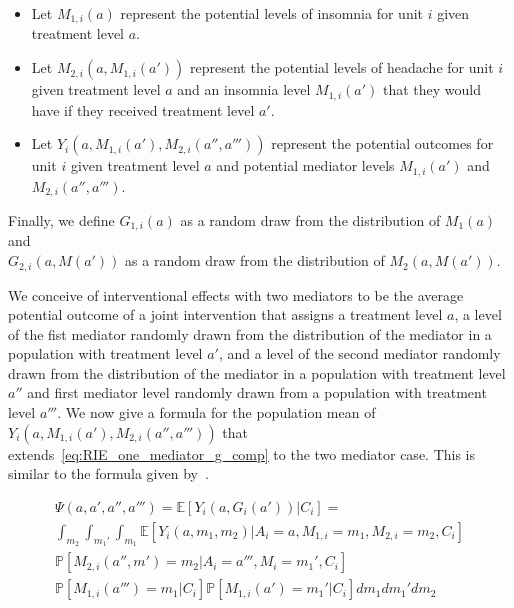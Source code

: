 \begin{itemize}[noitemsep,topsep=0pt]
	\item Let $M_{1,i}(a)$ represent the potential levels of insomnia for unit $i$ given 
	treatment level $a$. 
	\item Let $M_{2,i}(a,M_{1,i}(a'))$ represent the potential levels of headache for unit $i$ given 
	treatment level $a$ and an insomnia level $M_{1,i}(a')$ that they would have if they received 
	treatment level $a'$. 
	\item Let $Y_{i}(a,M_{1,i}(a'),M_{2,i}(a'',a'''))$ represent the potential outcomes 
	for unit $i$ given treatment level $a$ and potential mediator levels $M_{1,i}(a')$ and 
	$M_{2,i}(a'',a''')$. 
\end{itemize}

Finally, we define $G_{1,i}(a)$ as a random draw from the distribution of $M_{1}(a)$ 
and\\ $G_{2,i}(a,M(a'))$ as a random draw from the distribution of $M_{2}(a,M(a'))$. 

We conceive of interventional 
effects with two mediators to be the average potential outcome of a joint intervention that assigns
a treatment level $a$, a level of the fist mediator randomly drawn from the distribution of the 
mediator in a population with treatment level $a'$, and a level of the second mediator randomly drawn
from the distribution of the mediator in a population with treatment level $a''$ and first mediator 
level randomly drawn from a population with treatment level $a'''$. 
We now give a formula for the population mean of $Y_{i}(a,M_{1,i}(a'),M_{2,i}(a'',a'''))$ that
extends~\ref{eq:RIE_one_mediator_g_comp} to the two mediator case. This is similar to the formula given
by~\cite{linvanderweele2017}. 

\begin{equation}\label{eq:RIE_two_mediator_g_comp}
\begin{aligned}
	\Psi(a,a',a'',a''') = \mathbb{E}[Y_{i}(a,G_{i}(a'))|C_{i}] =\\ 
	\int_{m_{2}}\int_{m_{1}'}\int_{m_{1}} \mathbb{E}[Y_{i}(a,m_{1},m_{2})|A_{i} = a, 
	M_{1,i} = m_{1}, M_{2,i} = m_{2}, C_{i}]\\
	\mathbb{P}[M_{2,i}(a'',m') = m_{2}|A_{i} = a''', M_{i} = m_{1}', C_{i}]\\
	\mathbb{P}[M_{1,i}(a''') = m_{1}|C_{i}]\mathbb{P}[M_{1,i}(a') = m_{1}'|C_{i}]dm_{1}dm_{1}'dm_{2}
\end{aligned}
\end{equation}


